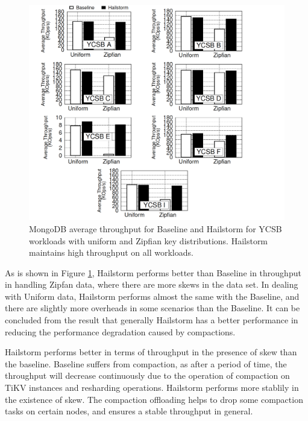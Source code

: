 \documentclass[a4paper,10pt,twoside]{article}
\begin{document}
\begin{figure}[h]
    \centering
	\includegraphics[scale=0.3]{YCSB_throughput.png}
    \caption{MongoDB average throughput for Baseline and Hailstorm
	for YCSB workloads with uniform and Zipfian key distributions.
	Hailstorm maintains high throughput on all workloads. \cite{mainpaper}}
    \label{fig:mesh7}
\end{figure}
As is shown in Figure \ref{fig:mesh7}, Hailstorm performs better than Baseline in throughput in handling Zipfan data, where there are more skews in the data set.
In dealing with Uniform data, Hailstorm performs almost the same with the Baseline, and there are slightly more overheads in some scenarios than the Baseline.
It can be concluded from the result that generally Hailstorm has a better performance in reducing the performance degradation caused by compactions.
\par
Hailstorm performs better in terms of throughput in the presence of skew than the baseline.
Baseline suffers from compaction, as after a period of time, the throughput will decrease continuously due to the operation of compaction on TiKV instances and resharding operations.
Hailstorm performs more stablily in the existence of skew. 
The compaction offloading helps to drop some compaction tasks on certain nodes, and ensures a stable throughput in general.
\end{document}
